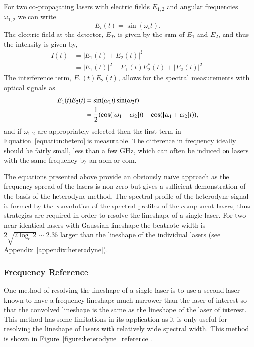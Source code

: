 For two co-propagating lasers with electric fields $E_{1, 2}$ and angular frequencies $\omega_{1, 2}$ we can write
\begin{equation}
E_{i}(t) = \sin(\omega_{i}t).
\end{equation}
The electric field at the detector, $E_T$, is given by the sum of $E_{1}$ and $E_{2}$, and thus the intensity is given by,
\begin{align}
I(t) &= |E_1(t) + E_2(t)|^2\nonumber\\
&= |E_1(t)|^2 + E_1(t)E_2^*(t) + |E_2(t)|^2.
\end{align}
The interference term, $E_1(t)E_2(t)$, allows for the spectral measurements with optical signals as
\begin{align}
E_1(t)E_2(t) &= \sin(\omega_1 t) \sin(\omega_2 t) \notag \\
&= \frac{1}{2} (\cos([\omega_1-\omega_2]t) - \cos([\omega_1+\omega_2]t)), \label{equation:hetero}
\end{align}
and if $\omega_{1,2}$ are appropriately selected then the first term in Equation~\ref{equation:hetero} is measurable.
The difference in frequency ideally should be fairly small, less than a few GHz, which can often be induced on lasers with the same frequency by an \gls{aom} or \gls{eom}.

The equations presented above provide an obviously na\"ive approach as the frequency spread of the lasers is non-zero but gives a sufficient demonstration of the basis of the heterodyne method.
The spectral profile of the heterodyne signal is formed by the convolution of the spectral profiles of the component lasers, thus strategies are required in order to resolve the lineshape of a single laser.
For two near identical lasers with Gaussian lineshape the beatnote width is $2\sqrt{2\log_e2}\sim2.35$ larger than the lineshape of the individual lasers (see Appendix~\ref{appendix:heterodyne}).

\subsubsection{Frequency Reference}
One method of resolving the lineshape of a single laser is to use a second laser known to have a frequency lineshape much narrower than the laser of interest so that the convolved lineshape is the same as the lineshape of the laser of interest.
This method has some limitations in its application as it is only useful for resolving the lineshape of lasers with relatively wide spectral width.
This method is shown in Figure~\ref{figure:heterodyne_reference}.

